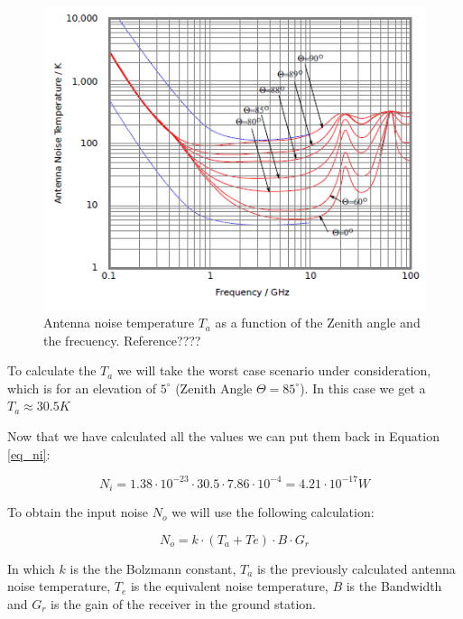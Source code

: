 \documentclass[a4paper,12pt,calibri,oneside,openany]{book}
\theoremstyle{break}
\begin{document}
		\begin{figure}[h]
			\includegraphics[width=14cm]{graph_Ta}
			\caption{Antenna noise temperature $T_{a}$ as a function of the Zenith angle and the frecuency. Reference????}
			\label{graf_Ta}
		\end{figure}
		
		
		To calculate the $T_{a}$ we will take the worst case scenario under consideration, which is for an elevation of $5^{\circ}$ (Zenith Angle $\Theta = 85^{\circ}$). In this case we get a $T_{a} \approx 30.5 \unit{K} $
	
		Now that we have calculated all the values we can put them back in Equation \ref{eq_ni}:
	
		\begin{equation} \label{eq_ni2}
			N_{i} = 1.38 \cdot 10^{-23} \cdot 30.5 \cdot 7.86 \cdot 10^{-4} = 4.21 \cdot 10^{-17} \unit{W}
		\end{equation}
	
		To obtain the input noise $N_{o}$ we will use the following calculation:
		
		\begin{equation} \label{eq_no}
			N_{o} = k \cdot \left(T_{a} + T{e} \right) \cdot B \cdot G_{r} 
		\end{equation}
	
		In which $k$ is the the Bolzmann constant, $T_{a}$ is the previously calculated antenna noise temperature, $T_{e}$ is the equivalent noise temperature, $B$ is the Bandwidth and $G_{r}$ is the gain of the receiver in the ground station. 
		
\end{document}

